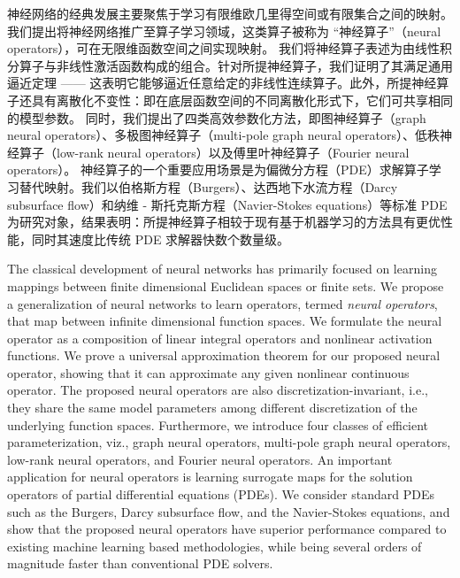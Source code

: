 神经网络的经典发展主要聚焦于学习有限维欧几里得空间或有限集合之间的映射。我们提出将神经网络推广至算子学习领域，这类算子被称为 “神经算子”（neural operators），可在无限维函数空间之间实现映射。
我们将神经算子表述为由线性积分算子与非线性激活函数构成的组合。针对所提神经算子，我们证明了其满足通用逼近定理 —— 这表明它能够逼近任意给定的非线性连续算子。此外，所提神经算子还具有离散化不变性：即在底层函数空间的不同离散化形式下，它们可共享相同的模型参数。
同时，我们提出了四类高效参数化方法，即图神经算子（graph neural operators）、多极图神经算子（multi-pole graph neural operators）、低秩神经算子（low-rank neural operators）以及傅里叶神经算子（Fourier neural operators）。
神经算子的一个重要应用场景是为偏微分方程（PDE）求解算子学习替代映射。我们以伯格斯方程（Burgers）、达西地下水流方程（Darcy subsurface flow）和纳维 - 斯托克斯方程（Navier-Stokes equations）等标准 PDE 为研究对象，结果表明：所提神经算子相较于现有基于机器学习的方法具有更优性能，同时其速度比传统 PDE 求解器快数个数量级。

The classical development of neural networks has primarily focused on learning mappings between finite dimensional Euclidean spaces or finite sets.
We propose a generalization of neural networks to learn operators, termed \emph{neural operators}, that map between infinite dimensional function spaces.
We formulate the neural operator as a composition of  linear integral operators and nonlinear activation functions. We prove a universal approximation theorem for our proposed neural operator, showing that it can approximate any given nonlinear continuous operator. The proposed neural operators are also discretization-invariant, i.e., they share the same model parameters among different discretization of the underlying function spaces. 
Furthermore, we introduce four classes of efficient parameterization, viz., graph neural operators,  multi-pole graph neural operators, low-rank neural operators, and Fourier neural operators.
An important application for neural operators is learning surrogate maps for the solution operators of
partial differential equations (PDEs). We consider standard PDEs such as the Burgers, Darcy subsurface flow, and the Navier-Stokes equations, and show that the proposed neural operators have superior performance compared to existing machine learning based methodologies,
while being several orders of magnitude faster than conventional PDE solvers. 




